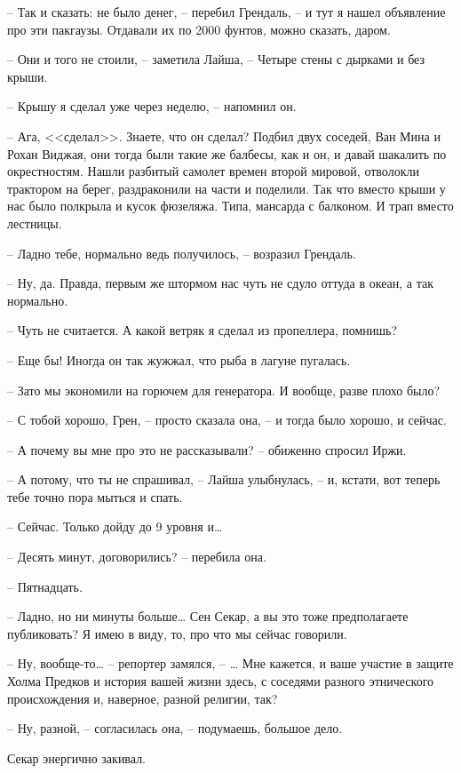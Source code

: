 -- Так и сказать: не было денег, -- перебил Грендаль, -- и тут я нашел объявление про эти пакгаузы. Отдавали их по 2000 фунтов, можно сказать, даром.

-- Они и того не стоили, -- заметила Лайша, -- Четыре стены с дырками и без крыши.

-- Крышу я сделал уже через неделю, -- напомнил он.

-- Ага, <<сделал>>. Знаете, что он сделал? Подбил двух соседей, Ван Мина и Рохан Виджая, они тогда были такие же балбесы, как и он, и давай шакалить по окрестностям. Нашли разбитый самолет времен второй мировой, отволокли трактором на берег, раздраконили на части и поделили. Так что вместо крыши у нас было полкрыла и кусок фюзеляжа. Типа, мансарда с балконом. И трап вместо лестницы.

-- Ладно тебе, нормально ведь получилось, -- возразил Грендаль.

-- Ну, да. Правда, первым же штормом нас чуть не сдуло оттуда в океан, а так нормально.

-- Чуть не считается. А какой ветряк я сделал из пропеллера, помнишь?

-- Еще бы! Иногда он так жужжал, что рыба в лагуне пугалась.

-- Зато мы экономили на горючем для генератора. И вообще, разве плохо было?

-- С тобой хорошо, Грен, -- просто сказала она, -- и тогда было хорошо, и сейчас.

-- А почему вы мне про это не рассказывали? -- обиженно спросил Иржи.

-- А потому, что ты не спрашивал, -- Лайша улыбнулась, -- и, кстати, вот теперь тебе точно пора мыться и спать.

-- Сейчас. Только дойду до 9 уровня и\ldots{}

-- Десять минут, договорились? -- перебила она.

-- Пятнадцать.

-- Ладно, но ни минуты больше\ldots{} Сен Секар, а вы это тоже предполагаете публиковать? Я имею в виду, то, про что мы сейчас говорили.

-- Ну, вообще-то\ldots{} -- репортер замялся, -- \ldots{} Мне кажется, и ваше участие в защите Холма Предков и история вашей жизни здесь, с соседями разного этнического происхождения и, наверное, разной религии, так?

-- Ну, разной, -- согласилась она, -- подумаешь, большое дело.

Секар энергично закивал.

